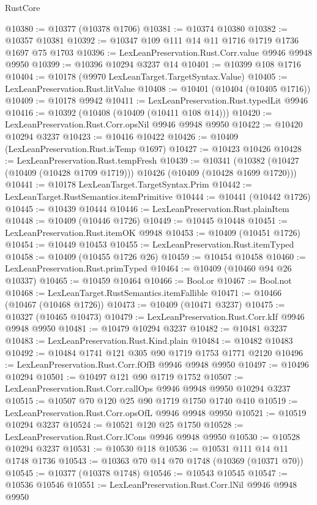 \begin{lexlean}{RustCore}
\begin{coremodule}
@10380 := @10377 (@10378 @1706)
@10381 := @10374 @10380
@10382 := @10357 @10381
@10392 := @10347 @109 @111 @14 @11 @1716 @1719 @1736 @1697 @75 @1703
@10396 := LexLeanPreservation.Rust.Corr.value @9946 @9948 @9950
@10399 := @10396 @10294 @3237 @14
@10401 := @10399 @108 @1716
@10404 := @10178 (@9970 LexLeanTarget.TargetSyntax.Value)
@10405 := LexLeanPreservation.Rust.litValue
@10408 := @10401 (@10404 (@10405 @1716))
@10409 := @10178 @9942
@10411 := LexLeanPreservation.Rust.typedLit @9946
@10416 := @10392 (@10408 (@10409 (@10411 @108 @14)))
@10420 := LexLeanPreservation.Rust.Corr.opsNil @9946 @9948 @9950
@10422 := @10420 @10294 @3237
@10423 := @10416 @10422
@10426 := @10409 (LexLeanPreservation.Rust.isTemp @1697)
@10427 := @10423 @10426
@10428 := LexLeanPreservation.Rust.tempFresh
@10439 := @10341
    (@10382 (@10427 (@10409 (@10428 @1709 @1719))) @10426 (@10409 (@10428 @1699 @1720)))
@10441 := @10178 LexLeanTarget.TargetSyntax.Prim
@10442 := LexLeanTarget.RustSemantics.itemPrimitive
@10444 := @10441 (@10442 @1726)
@10445 := @10439 @10444
@10446 := LexLeanPreservation.Rust.plainItem
@10448 := @10409 (@10446 @1726)
@10449 := @10445 @10448
@10451 := LexLeanPreservation.Rust.itemOK @9948
@10453 := @10409 (@10451 @1726)
@10454 := @10449 @10453
@10455 := LexLeanPreservation.Rust.itemTyped
@10458 := @10409 (@10455 @1726 @26)
@10459 := @10454 @10458
@10460 := LexLeanPreservation.Rust.primTyped
@10464 := @10409 (@10460 @94 @26 @10337)
@10465 := @10459 @10464
@10466 := Bool.or
@10467 := Bool.not
@10468 := LexLeanTarget.RustSemantics.itemFallible
@10471 := @10466 (@10467 (@10468 @1726))
@10473 := @10409 (@10471 @3237)
@10475 := @10327 (@10465 @10473)
@10479 := LexLeanPreservation.Rust.Corr.kIf @9946 @9948 @9950
@10481 := @10479 @10294 @3237
@10482 := @10481 @3237
@10483 := LexLeanPreservation.Rust.Kind.plain
@10484 := @10482 @10483
@10492 := @10484 @1741 @121 @305 @90 @1719 @1753 @1771 @2120
@10496 := LexLeanPreservation.Rust.Corr.fOfB @9946 @9948 @9950
@10497 := @10496 @10294
@10501 := @10497 @121 @90 @1719 @1752
@10507 := LexLeanPreservation.Rust.Corr.callOps @9946 @9948 @9950 @10294 @3237
@10515 := @10507 @70 @120 @25 @90 @1719 @1750 @1740 @410
@10519 := LexLeanPreservation.Rust.Corr.opsOfL @9946 @9948 @9950
@10521 := @10519 @10294 @3237
@10524 := @10521 @120 @25 @1750
@10528 := LexLeanPreservation.Rust.Corr.lCons @9946 @9948 @9950
@10530 := @10528 @10294 @3237
@10531 := @10530 @118
@10536 := @10531 @111 @14 @11 @1748 @1736
@10543 := @10363 @70 @14 @70 @1748 (@10369 (@10371 @70))
@10545 := @10377 (@10378 @1748)
@10546 := @10543 @10545
@10547 := @10536 @10546
@10551 := LexLeanPreservation.Rust.Corr.lNil @9946 @9948 @9950

\end{coremodule}
\end{lexlean}

